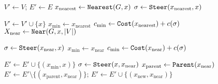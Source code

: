 \begin{algorithm}[H]
    $V' \leftarrow V$; $E' \leftarrow E$\;
    $x_\mathrm{nearest} \leftarrow {\tt Nearest} (G, x)$\; \label{rrtstar:extend_nearest_start}
    $\sigma \leftarrow {\tt Steer} (x_\mathrm{nearest}, x)$\; \label{rrtstar:extend_nearest_end}
    {
        $V' \leftarrow V' \cup \{x\}$\;
        $x_\mathrm{min} \leftarrow x_\mathrm{nearest}$\;
        $c_\mathrm{min} \leftarrow {\tt Cost}(x_\mathrm{nearest}) + c(\sigma)$\;    
        \label{rrtstar:connect_to_close_node_start}
        $X_\mathrm{near} \leftarrow {\tt Near} (G, x, \vert V \vert)$\; 
        {
                $\sigma \leftarrow {\tt Steer} (x_\mathrm{near},x)$\;
                {
                    $x_\mathrm{min} \leftarrow x_\mathrm{near}$\;
                    $c_\mathrm{min} \leftarrow {\tt Cost} (x_\mathrm{near}) + c(\sigma)$\;
                }
            
        }

        $E' \leftarrow E' \cup \{(x_\mathrm{min}, x)\}$\;
        \label{rrtstar:connect_to_close_node_end}
        { 
            $\sigma \leftarrow {\tt Steer}(x, x_\mathrm{near})$\;
            {
                $x_\mathrm{parent} \leftarrow {\tt Parent} (x_\mathrm{near})$\;
                $E' \leftarrow E' \setminus \{ (x_\mathrm{parent}, x_\mathrm{near})\}$;
                $E' \leftarrow E' \cup \{(x_\mathrm{new}, x_\mathrm{near}) \}$\;  
                \label{rrtstar:extend_back_to_tree_end}
            } 
        } 
    }
    \caption{${\tt Extend}_{RRT^*} ((V,E),x)$}
    \label{algorithm:rrtstar_extend}
\end{algorithm}

